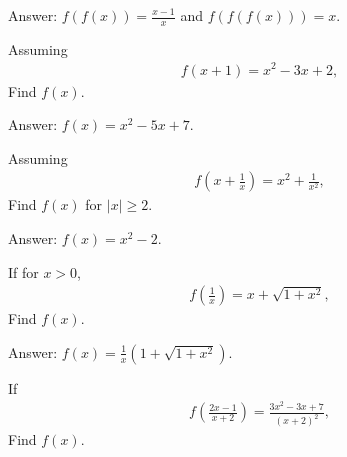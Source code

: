 \begin{solution}[name=Solution by Parviz Shahriari]
Answer: $f(f(x))=\frac{x-1}{x}$ and $f(f(f(x)))=x$.
\end{solution}



\begin{tcolorbox}
\begin{question}
Assuming
\begin{align*}
    f(x+1)= x^2-3x+2,
\end{align*}
Find $f(x)$.
\end{question}
\end{tcolorbox}

\begin{solution}[name=Solution by Parviz Shahriari]
Answer: $f(x)=x^2-5x+7$.
\end{solution}


\begin{tcolorbox}
\begin{question}
Assuming
\begin{align*}
    f\left(x+\frac{1}{x}\right)= x^2 + \frac{1}{x^2},
\end{align*}
Find $f(x)$ for $|x| \geq 2$.
\end{question}
\end{tcolorbox}

\begin{solution}[name=Solution by Parviz Shahriari]
Answer: $f(x)=x^2-2$.
\end{solution}



\begin{tcolorbox}
\begin{question}
If for $x >0$,
\begin{align*}
    f\left(\frac{1}{x}\right)= x+ \sqrt{1+x^2},
\end{align*}
Find $f(x)$.
\end{question}
\end{tcolorbox}

\begin{solution}[name=Solution by Parviz Shahriari]
Answer: $f(x)=\frac{1}{x}\left(1+\sqrt{1+x^2}\right)$.
\end{solution}



\begin{tcolorbox}
\begin{question}
If
\begin{align*}
    f\left(\frac{2x-1}{x+2}\right)= \frac{3x^2-3x+7}{(x+2)^2},
\end{align*}
Find $f(x)$.
\end{question}
\end{tcolorbox}

